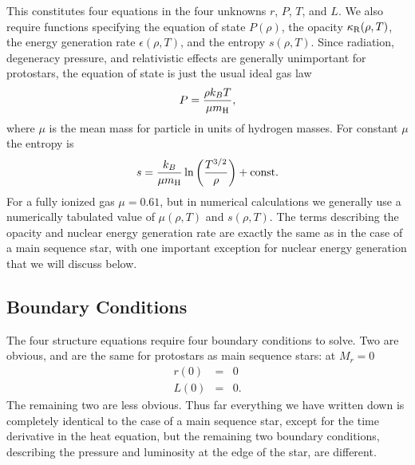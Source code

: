 This constitutes four equations in the four unknowns $r$, $P$, $T$, and $L$.  We also require functions specifying the equation of state $P(\rho)$, the opacity $\kappa_{\rm R}(\rho,T)$, the energy generation rate $\epsilon(\rho,T)$, and the entropy $s(\rho,T)$. Since radiation, degeneracy pressure, and relativistic effects are generally unimportant for protostars, the equation of state is just the usual ideal gas law
\begin{equation}
P = \frac{\rho k_B T}{\mu m_{\rm H}},
\end{equation}
where $\mu$ is the mean mass for particle in units of hydrogen masses. For constant $\mu$ the entropy is
\begin{equation}
s = \frac{k_B}{\mu m_{\rm H}} \ln \left(\frac{T^{3/2}}{\rho}\right) + \mbox{const}.
\end{equation}
For a fully ionized gas $\mu=0.61$, but in numerical calculations we generally use a numerically tabulated value of $\mu(\rho, T)$ and $s(\rho,T)$. The terms describing the opacity and nuclear energy generation rate are exactly the same as in the case of a main sequence star, with one important exception for nuclear energy generation that we will discuss below.

\subsection{Boundary Conditions}

The four structure equations require four boundary conditions to solve. Two are obvious, and are the same for protostars as main sequence stars: at $M_r=0$
\begin{eqnarray}
r(0) & = & 0\\
L(0) & = & 0.
\end{eqnarray}
The remaining two are less obvious. Thus far everything we have written down is completely identical to the case of a main sequence star, except for the time derivative in the heat equation, but the remaining two boundary conditions, describing the pressure and luminosity at the edge of the star, are different.

